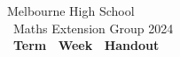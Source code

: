 \documentclass[a4paper]{article}
\title{{\thepdftitle}}
\author{}
\date{2024}
\newcommand{\theterm}{}
\newcommand{\theweek}{}
\newcommand{\thedisplaytitle}{Term \theterm\ Week \theweek\ Handout}
\begin{document}
\noindent Melbourne High School\\\
\noindent Maths Extension Group 2024\\\
\noindent \textbf{\thedisplaytitle}\\\


\end{document}
